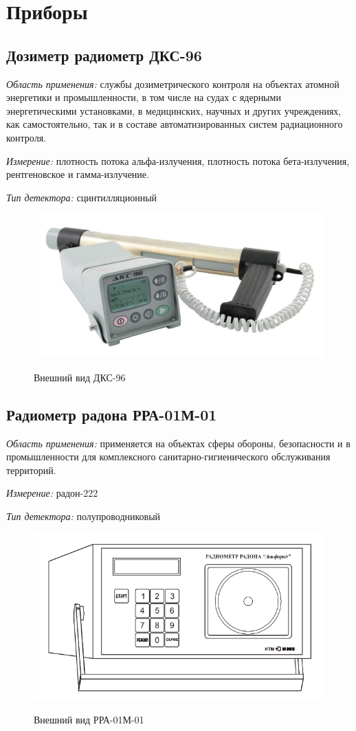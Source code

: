 \documentclass[14pt,pscyr,titlepage]{hedreport}
\begin{document}
	\pagebreak
	\section{Приборы}
	\subsection{Дозиметр радиометр ДКС-96}
		\emph{Область применения:} службы дозиметрического контроля на объектах 
		атомной энергетики и промышленности, в том числе на судах с ядерными 
		энергетическими установками, в медицинских, научных и других 
		учреждениях, как самостоятельно, так и в составе автоматизированных 
		систем радиационного контроля.
		
		\emph{Измерение:} плотность потока альфа-излучения, плотность потока 
			бета-излучения, рентгеновское и гамма-излучение. 

		\emph{Тип детектора:} сцинтилляционный

		\begin{figure}[h!]
			\center
			\includegraphics[width=.8\textwidth]{DKS-96} \\
			\caption{Внешний вид ДКС-96}
		\end{figure}

	\pagebreak

	\subsection{Радиометр радона РРА-01М-01}
		\emph{Область применения:} применяется на объектах сферы обороны, 
			безопасности и в промышленности для комплексного 
			санитарно-гигиенического обслуживания территорий.

		\emph{Измерение:} радон-222

		\emph{Тип детектора:} полупроводниковый

		\begin{figure}[h!]
			\center
			\includegraphics[width=.8\textwidth]{RRA-01M-01} \\
			\caption{Внешний вид РРА-01М-01}
		\end{figure}
\end{document}
